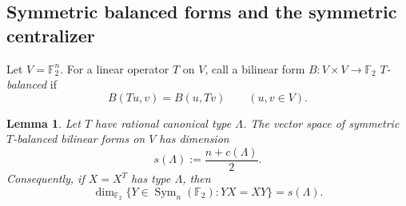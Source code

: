\documentclass[11pt]{amsart}
\newtheorem{lemma}[theorem]{Lemma}
\theoremstyle{remark}
\numberwithin{equation}{section}
\newcommand{\F}{\mathbb F}
\newcommand{\Sym}{\operatorname{Sym}}
\begin{document}
\subsection{Symmetric balanced forms and the symmetric centralizer}

Let $V=\F_2^n$.  For a linear operator $T$ on $V$, call a bilinear form $B:V\times V\to\F_2$ \emph{$T$-balanced} if
\[
        B(Tu,v)=B(u,Tv)\qquad(u,v\in V).
\]

\begin{lemma}\label{lem:balanced-dimension-lambda}
Let $T$ have rational canonical type $\Lambda$.  The vector space of symmetric $T$-balanced bilinear forms on $V$ has dimension
\[
        s(\Lambda):=\frac{n+c(\Lambda)}2.
\]
Consequently, if $X=X^T$ has type $\Lambda$, then
\[
        \dim_{\F_2}\{Y\in\Sym_n(\F_2):YX=XY\}=s(\Lambda).
\]
\end{lemma}
\end{document}
